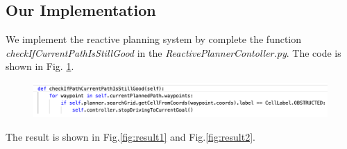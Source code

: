 \documentclass{article}
\begin{document}
\subsection {Our Implementation}

We implement the reactive planning system by complete the function \textit{checkIfCurrentPathIsStillGood} in the \textit{ReactivePlannerContoller.py}. The code is shown in Fig. \ref{fig:code}.

\begin{figure}[ht]
\centering
\includegraphics[scale=0.6]{graphs/part1/code.PNG}
\caption{}
\label{fig:code}
\end{figure}

The result is shown in Fig.\ref{fig:result1} and Fig.\ref{fig:result2}.
\end{document}

